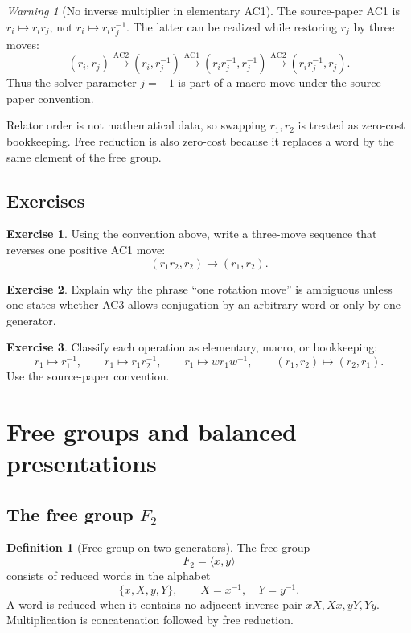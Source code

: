 \documentclass[11pt]{article}
\theoremstyle{definition}
\newtheorem{definition}[theorem]{Definition}
\newtheorem{exercise}{Exercise}[section]
\theoremstyle{remark}
\newtheorem{warning}[theorem]{Warning}
\newcommand{\F}{F_2}
\newcommand{\AC}{\mathrm{AC}}
\begin{document}
\begin{warning}[No inverse multiplier in elementary AC1]
The source-paper AC1 is \(r_i\mapsto r_i r_j\), not
\(r_i\mapsto r_i r_j^{-1}\).  The latter can be realized while restoring
\(r_j\) by three moves:
\[
(r_i,r_j)\xrightarrow{\AC2}(r_i,r_j^{-1})
\xrightarrow{\AC1}(r_i r_j^{-1},r_j^{-1})
\xrightarrow{\AC2}(r_i r_j^{-1},r_j).
\]
Thus the solver parameter \(j=-1\) is part of a macro-move under the
source-paper convention.
\end{warning}

Relator order is not mathematical data, so swapping \(r_1,r_2\) is treated
as zero-cost bookkeeping.  Free reduction is also zero-cost because it
replaces a word by the same element of the free group.

\subsection*{Exercises}

\begin{exercise}
Using the convention above, write a three-move sequence that reverses one
positive AC1 move:
\[
  (r_1r_2,r_2)\longrightarrow (r_1,r_2).
\]
\end{exercise}

\begin{exercise}
Explain why the phrase ``one rotation move'' is ambiguous unless one states
whether AC3 allows conjugation by an arbitrary word or only by one generator.
\end{exercise}

\begin{exercise}
Classify each operation as elementary, macro, or bookkeeping:
\[
r_1\mapsto r_1^{-1},\qquad
r_1\mapsto r_1r_2^{-1},\qquad
r_1\mapsto w r_1w^{-1},\qquad
(r_1,r_2)\mapsto(r_2,r_1).
\]
Use the source-paper convention.
\end{exercise}

\section{Free groups and balanced presentations}
\label{sec:free-presentations}

\subsection{The free group \(F_2\)}

\begin{definition}[Free group on two generators]
The free group
\[
  \F=\langle x,y\rangle
\]
consists of reduced words in the alphabet
\[
  \{x,X,y,Y\},\qquad X=x^{-1},\quad Y=y^{-1}.
\]
A word is reduced when it contains no adjacent inverse pair
\(xX,Xx,yY,Yy\).  Multiplication is concatenation followed by free
reduction.
\end{definition}
\end{document}
